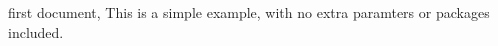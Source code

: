 \documentclass{article}
\begin{document}
    first document, This is a simple example, with no
    extra paramters or packages included.
\end{document}
